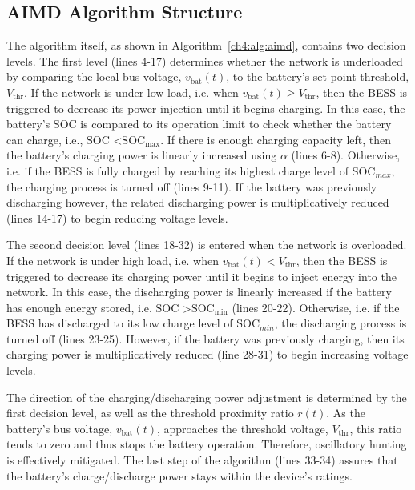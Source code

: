 \subsection{AIMD Algorithm Structure}

The algorithm itself, as shown in Algorithm~\ref{ch4:alg:aimd}, contains two decision levels.
The first level (lines 4-17) determines whether the network is underloaded by comparing the local bus voltage, $v_\text{bat}(t)$, to the battery's set-point threshold, $V_\text{thr}$.
If the network is under low load, i.e. when $v_\text{bat}(t) \geq V_\text{thr}$, then the BESS is triggered to decrease its power injection until it begins charging.
In this case, the battery's SOC is compared to its operation limit to check whether the battery can charge, i.e., $\text{SOC}$ \textless $\text{SOC}_\text{max}$.
If there is enough charging capacity left, then the battery's charging power is linearly increased using $\alpha$ (lines 6-8).
Otherwise, i.e. if the BESS is fully charged by reaching its highest charge level of $\text{SOC}_{max}$, the charging process is turned off (lines 9-11).
If the battery was previously discharging however, the related discharging power is multiplicatively reduced (lines 14-17) to begin reducing voltage levels.

The second decision level (lines 18-32) is entered when the network is overloaded.
If the network is under high load, i.e. when $v_\text{bat}(t) < V_\text{thr}$, then the BESS is triggered to decrease its charging power until it begins to inject energy into the network. 
In this case, the discharging power is linearly increased if the battery has enough energy stored, i.e. $\text{SOC}$ \textgreater $\text{SOC}_\text{min}$ (lines 20-22).
Otherwise, i.e. if the BESS has discharged to its low charge level of $\text{SOC}_{min}$, the discharging process is turned off (lines 23-25).
However, if the battery was previously charging, then its charging power is multiplicatively reduced (line 28-31) to begin increasing voltage levels.

The direction of the charging/discharging power adjustment is determined by the first decision level, as well as the threshold proximity ratio $r(t)$.
As the battery's bus voltage, $v_\text{bat}(t)$, approaches the threshold voltage, $V_\text{thr}$, this ratio tends to zero and thus stops the battery operation.
Therefore, oscillatory hunting is effectively mitigated.
The last step of the algorithm (lines 33-34) assures that the battery's charge/discharge power stays within the device's ratings.

